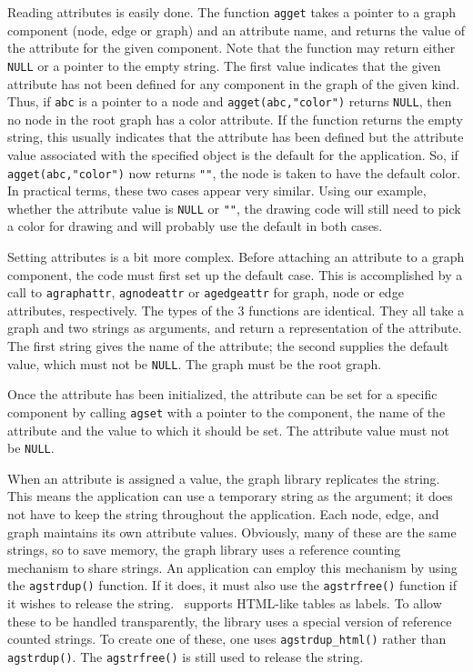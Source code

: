 Reading attributes is easily done. The function {\tt agget} takes a pointer
to a graph component (node, edge or graph) and an attribute name, and
returns the value of the attribute for the given component. Note that the
function may return either {\tt NULL} or a pointer to the empty string.
The first value indicates that the given attribute has not been defined for
any component in the graph of the given kind. Thus, if {\tt abc} is a
pointer to a node and {\tt agget(abc,"color")} returns {\tt NULL}, then
no node in the root graph has a color attribute. If the function returns
the empty string, this usually indicates that the attribute has been 
defined but the attribute value associated with the specified object is the
default for the application. So, if {\tt agget(abc,"color")} 
now returns {\tt ""}, the node is taken to have the default color. In
practical terms, these two cases appear very similar. Using our example,
whether the attribute value is {\tt NULL} or {\tt ""}, the drawing code
will still need to pick a color for drawing and will probably use the
default in both cases.

Setting attributes is a bit more complex. Before attaching an attribute
to a graph component, the code must first set up the default case. This
is accomplished by a call to {\tt agraphattr}, {\tt agnodeattr} or 
{\tt agedgeattr} for graph, node or edge attributes, respectively.
The types of the 3 functions are identical. They all take a graph and
two strings as arguments, and return a representation of the attribute.
The first string gives the name of the attribute; the second supplies
the default value, which must not be {\tt NULL}. 
The graph must be the root graph.

Once the attribute has been initialized, the attribute can be set for
a specific component by calling {\tt agset} with a pointer to the component,
the name of the attribute and the value to which it should be set.
The attribute value must not be {\tt NULL}.

When an attribute is assigned a value, the graph library replicates the
string. This means the application can use a temporary string as the
argument; it does not have to keep the string throughout the application.
Each node, edge, and graph maintains its own attribute 
values. Obviously, many of these are the same strings, so to save
memory, the graph library uses a reference counting mechanism to 
share strings. An application can employ this mechanism by using
the {\tt agstrdup()} function. If it does, it must also use the
{\tt agstrfree()} function if it wishes to release the string.
\gviz\ supports HTML-like tables as labels. To allow these to be handled
transparently, the library uses a special version of reference counted
strings. To create one of these, one uses {\tt agstrdup\_html()}
rather than {\tt agstrdup()}. The {\tt agstrfree()} is still used to
release the string.

